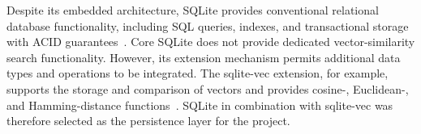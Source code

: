 Despite its embedded architecture, SQLite provides conventional relational database functionality, including SQL queries, indexes, and transactional storage with ACID guarantees~\cite{gaffney2022sqlite}. Core SQLite does not provide dedicated vector-similarity search functionality. However, its extension mechanism permits additional data types and operations to be integrated. The sqlite-vec extension, for example, supports the storage and comparison of vectors and provides cosine-, Euclidean-, and Hamming-distance functions~\cite{garcia2024sqlitevec}. SQLite in combination with sqlite-vec was therefore selected as the persistence layer for
the project.

